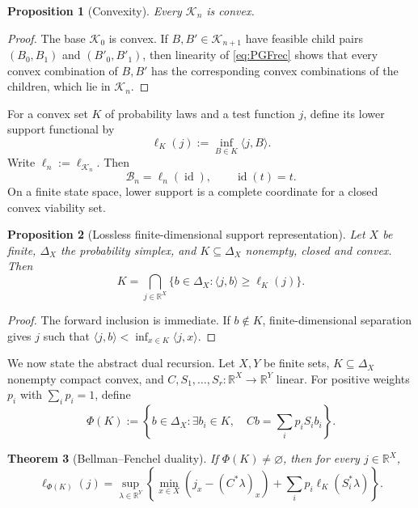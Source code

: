 \documentclass[11pt,a4paper]{article}
\newtheorem{theorem}{Theorem}[section]
\newtheorem{proposition}[theorem]{Proposition}
\theoremstyle{definition}
\theoremstyle{remark}
\newcommand{\R}{\mathbb R}
\newcommand{\cK}{\mathcal K}
\newcommand{\cB}{\mathcal B}
\newcommand{\id}{\operatorname{id}}
\begin{document}
\begin{proposition}[Convexity]
Every \(\cK_n\) is convex.
\end{proposition}

\begin{proof}
The base \(\cK_0\) is convex.  If \(B,B'\in\cK_{n+1}\) have feasible child
pairs \((B_0,B_1)\) and \((B'_0,B'_1)\), then linearity of
\eqref{eq:PGFrec} shows that every convex combination of \(B,B'\) has the
corresponding convex combinations of the children, which lie in \(\cK_n\).
\end{proof}

For a convex set \(K\) of probability laws and a test function \(j\), define
its lower support functional by
\begin{equation}
 \ell_K(j):=\inf_{B\in K}\langle j,B\rangle.
 \label{eq:lowerSupport}
\end{equation}
Write \(\ell_n:=\ell_{\cK_n}\).  Then
\[
 \cB_n=\ell_n(\id),
 \qquad \id(t)=t.
\]
On a finite state space, lower support is a complete coordinate for a closed
convex viability set.

\begin{proposition}[Lossless finite-dimensional support representation]
Let \(X\) be finite, \(\Delta_X\) the probability simplex, and
\(K\subseteq\Delta_X\) nonempty, closed and convex.  Then
\begin{equation}
 K=
 \bigcap_{j\in\R^X}
 \{b\in\Delta_X:\langle j,b\rangle\ge\ell_K(j)\}.
 \label{eq:recoverK}
\end{equation}
\end{proposition}

\begin{proof}
The forward inclusion is immediate.  If \(b\notin K\), finite-dimensional
separation gives \(j\) such that
\(\langle j,b\rangle<\inf_{x\in K}\langle j,x\rangle\).
\end{proof}

We now state the abstract dual recursion.  Let \(X,Y\) be finite sets,
\(K\subseteq\Delta_X\) nonempty compact convex, and
\(C,S_1,\ldots,S_r:\R^X\to\R^Y\) linear.  For positive weights \(p_i\)
with \(\sum_i p_i=1\), define
\[
 \Phi(K):=
 \left\{b\in\Delta_X:\exists b_i\in K,\quad
 Cb=\sum_i p_iS_ib_i\right\}.
\]

\begin{theorem}[Bellman--Fenchel duality]
\label{thm:BF}
If \(\Phi(K)\neq\varnothing\), then for every \(j\in\R^X\),
\begin{equation}
 \boxed{
 \ell_{\Phi(K)}(j)
 =
 \sup_{\lambda\in\R^Y}
 \left\{
 \min_{x\in X}(j_x-(C^*\lambda)_x)
 +\sum_i p_i\ell_K(S_i^*\lambda)
 \right\}.
 }
 \label{eq:BF}
\end{equation}
\end{theorem}
\end{document}
